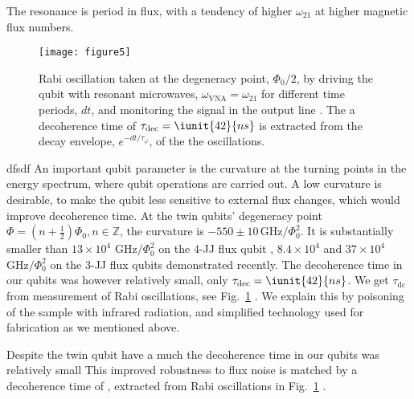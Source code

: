 The resonance is period in  flux, with a tendency of higher
$\omega_{21}$ at higher magnetic flux numbers.
 
 \begin{figure}[h!]
   \texttt{[image: figure5]}
   \caption{Rabi oscillation taken at the degeneracy point,
     $  \Phi_0/2  $, by  driving  the  qubit with  resonant
     microwaves,  $\omega_{\text{VNA}}  = \omega_{21}$  for
     different  time periods,  $ dt  $, and  monitoring the
     signal  in   the  output  line  \cite{rabi}.    The  a
     decoherence                   time                  of
     $  \tau_{\text{dec}} =  \iunit{42}{ns} $  is extracted
     from the decay envelope,  $ e^{-dt/\tau_\varphi} $, of
     the the oscillations. \label{fig:rabi}}
 \end{figure}
 dfsdf An important qubit parameter is the curvature at the
 turning  points  in  the   energy  spectrum,  where  qubit
 operations are carried out.  A low curvature is desirable,
 to make the qubit less sensitive to external flux changes,
 which would improve decoherence time.  At the twin qubits'
 degeneracy                                           point
 $ \Phi  = (n  + \frac{1}{2})\Phi_0, n\in\mathbb{Z}  $, the
 curvature  is $  -550\pm10\,\text{GHz}/\Phi_0^2 $.   It is
 substantially    smaller    than    $    13\times    10^4$
 $   \text{GHz}/\Phi_0^2$   on    the   4-JJ   flux   qubit
 \cite{stern2014},  $ 8.4  \times 10^4$  \cite{zhu2010} and
 $     37\times      10^{4}$     $     \text{GHz}/\Phi_0^2$
 \cite{gustavsson2012} on the 3-JJ flux qubits demonstrated
 recently.  The decoherence time  in our qubits was however
 relatively                   small,                   only
 $   \tau_\text{dec}   =    \iunit{42}{ns}   $.    We   get
 $\tau_\text{dc}$  from measurement  of Rabi  oscillations,
 see Fig.~\ref{fig:rabi}  \cite{rabi}.  We explain  this by
 poisoning  of  the  sample with  infrared  radiation,  and
 simplified technology used for fabrication as we mentioned
 above.

 Despite the twin qubit have a much the decoherence time in
 our qubits  was relatively small This  improved robustness
 to  flux noise  is  matched  by a  decoherence  time of  ,
 extracted  from Rabi  oscillations in  Fig.~\ref{fig:rabi}
 \cite{rabi}.

